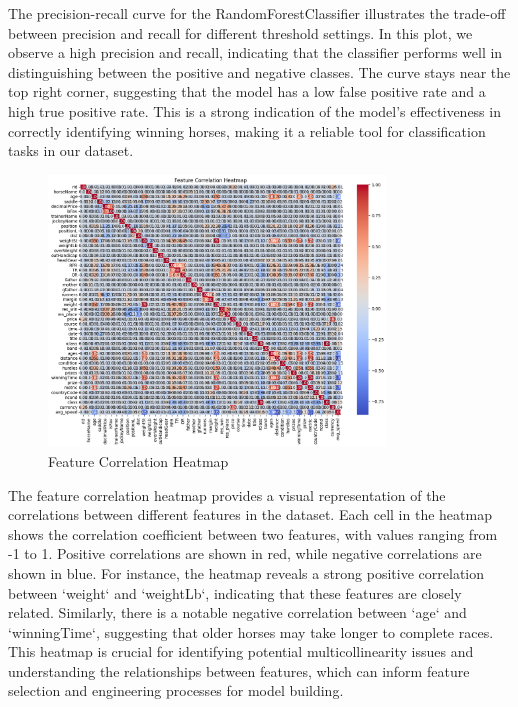 \documentclass{article}
\begin{document}
The precision-recall curve for the RandomForestClassifier illustrates the trade-off between precision and recall for different threshold settings. In this plot, we observe a high precision and recall, indicating that the classifier performs well in distinguishing between the positive and negative classes. The curve stays near the top right corner, suggesting that the model has a low false positive rate and a high true positive rate. This is a strong indication of the model's effectiveness in correctly identifying winning horses, making it a reliable tool for classification tasks in our dataset.

\begin{figure}[H]
    \centering
    \includegraphics[width=0.8\textwidth]{images/feature_correlation_heatmap.png} %
    \caption{Feature Correlation Heatmap}
    \label{fig:feature_correlation_heatmap}
\end{figure}

The feature correlation heatmap provides a visual representation of the correlations between different features in the dataset. Each cell in the heatmap shows the correlation coefficient between two features, with values ranging from -1 to 1. Positive correlations are shown in red, while negative correlations are shown in blue. For instance, the heatmap reveals a strong positive correlation between `weight` and `weightLb`, indicating that these features are closely related. Similarly, there is a notable negative correlation between `age` and `winningTime`, suggesting that older horses may take longer to complete races. This heatmap is crucial for identifying potential multicollinearity issues and understanding the relationships between features, which can inform feature selection and engineering processes for model building.
\end{document}
